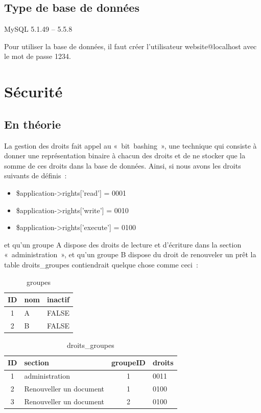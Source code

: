 \documentclass[letter, 11pt]{report}
\begin{document}
\subsection{Type de base de données}
MySQL 5.1.49 -- 5.5.8

Pour utiliser la base de données, il faut créer l'utilisateur website@localhost avec le mot de passe 1234.

\section{Sécurité}
\label{sec:sécurité}

\subsection{En théorie}

La gestion des droits fait appel au «~bit~bashing~», une technique qui consiste à donner une représentation binaire à chacun des droits et de ne stocker que la somme de ces droits dans la base de données. Ainsi, si nous avons les droits suivants de définis~:

\begin{itemize}
	\item \$application->rights['read'] = 0001
	\item \$application->rights['write'] = 0010
	\item \$application->rights['execute'] = 0100
\end{itemize}

et qu'un groupe A dispose des droits de lecture et d'écriture dans la section «~administration~», et qu'un groupe B dispose du droit de renouveler un prêt la table droits\_groupes contiendrait quelque chose comme ceci~:

\begin{table}[ht]
	\caption{groupes}
	\begin{center}
		\begin{tabular}{|c|l|l|}
			\hline
			ID & nom & inactif \\
			\hline
			1  & A   & FALSE \\
			2  & B   & FALSE \\
			\hline
		\end{tabular}
	\end{center}
\end{table}

\begin{table}[h!]
	\caption{droits\_groupes}
	\begin{center}
		\begin{tabular}{|c|l|c|l|}
			\hline
			ID & section                 & groupeID & droits \\
			\hline
			1  & administration          & 1        & 0011 \\
			2  & Renouveller un document & 1        & 0100 \\
			3  & Renouveller un document & 2        & 0100 \\
			\hline
		\end{tabular}
	\end{center}
\end{table}
\end{document}
